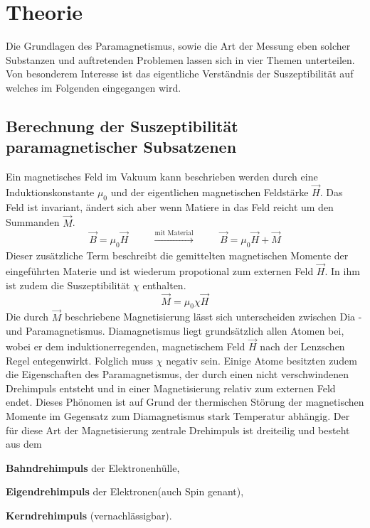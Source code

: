\section{Theorie}
\label{sec:theo}
Die Grundlagen des Paramagnetismus, sowie die Art der Messung eben solcher Substanzen und auftretenden Problemen 
lassen sich in vier Themen unterteilen. Von besonderem Interesse ist das eigentliche Verständnis der Suszeptibilität 
auf welches im Folgenden eingegangen wird.

\subsection{Berechnung der Suszeptibilität paramagnetischer Subsatzenen}
\label{sadge1}
Ein magnetisches Feld im Vakuum kann beschrieben werden durch eine Induktionskonstante $\mu_0$ und der eigentlichen magnetischen Feldstärke
$\vec{H}$. Das Feld ist invariant, ändert sich aber wenn Matiere in das Feld reicht um den Summanden $\vec{M}$. 
\begin{equation*}
    \vec{B}=\mu_0 \vec{H} \hspace{1cm} \xrightarrow[]{\text{mit Material}} \hspace{1cm} \vec{B}=\mu_0 \vec{H} + \vec{M}
\end{equation*}
Dieser zusätzliche Term beschreibt die gemittelten magnetischen Momente der eingeführten Materie und ist wiederum propotional zum externen Feld $\vec{H}$. 
In ihm ist zudem die Suszeptibilität $\chi$ enthalten.
\begin{equation*}
    \vec{M} = \mu_0 \chi \vec{H}
\end{equation*}
Die durch $\vec{M}$ beschriebene Magnetisierung lässt sich unterscheiden zwischen Dia - und Paramagnetismus. 
Diamagnetismus liegt grundsätzlich allen Atomen bei, wobei er dem induktionerregenden, magnetischem Feld $\vec{H}$ nach der Lenzschen Regel
entegenwirkt. Folglich muss $\chi$ negativ sein.
Einige Atome besitzten zudem die Eigenschaften des Paramagnetismus, der durch einen nicht verschwindenen Drehimpuls entsteht und in einer 
Magnetisierung relativ zum externen Feld endet.
Dieses Phönomen ist auf Grund der thermischen Störung der magnetischen Momente im Gegensatz zum Diamagnetismus stark Temperatur abhängig.
Der für diese Art der Magnetisierung zentrale Drehimpuls ist dreiteilig und besteht aus dem
\begin{description}
    \item \textbf{Bahndrehimpuls} der Elektronenhülle,\\
    \item \textbf{Eigendrehimpuls} der Elektronen(auch Spin genant), \\
    \item \textbf{Kerndrehimpuls} (vernachlässigbar).
\end{description}
